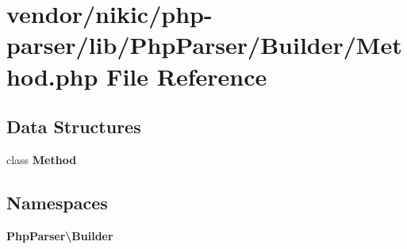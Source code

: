 \section{vendor/nikic/php-\/parser/lib/\+Php\+Parser/\+Builder/\+Method.php File Reference}
\label{nikic_2php-parser_2lib_2_php_parser_2_builder_2_method_8php}
\subsection*{Data Structures}
\begin{DoxyCompactItemize}
\item 
class {\bf Method}
\end{DoxyCompactItemize}
\subsection*{Namespaces}
\begin{DoxyCompactItemize}
\item 
 {\bf Php\+Parser\textbackslash{}\+Builder}
\end{DoxyCompactItemize}
